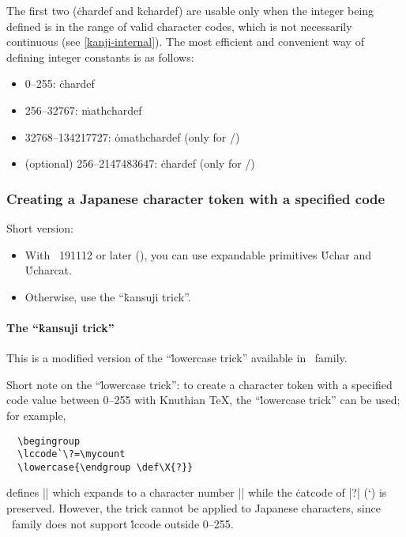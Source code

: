 \documentclass[a4paper,11pt,dvipdfmx]{article}
\begin{document}
The first two (\.{chardef} and \.{kchardef}) are usable only when
the integer being defined is in the range of valid character codes,
which is not necessarily continuous (see \ref{kanji-internal}).
The most efficient and convenient way of defining integer constants
is as follows:
\begin{itemize}
 \item 0--255: \.{chardef}
 \item 256--32767: \.{mathchardef}
 \item 32768--134217727: \.{omathchardef} (only for \epTeX/\eupTeX)
 \item (optional) 256--2147483647: \.{chardef} (only for \upTeX/\eupTeX)
\end{itemize}

\subsubsection{Creating a Japanese character token with a specified code}

Short version:
\begin{itemize}
 \item With \epTeX~191112 or later (),
   you can use expandable primitives \.{Uchar} and \.{Ucharcat}.
 \item Otherwise, use the ``\.{kansuji} trick''.
\end{itemize}

\paragraph{The ``\.{kansuji} trick''}
This is a modified version of the ``\.{lowercase} trick''
available in \pTeX\ family.

\begin{dangerous}
Short note on the ``\.{lowercase} trick'':
to create a character token with a specified code value between 0--255
with Knuthian \TeX, the ``\.{lowercase} trick'' can be used; for example,
\begin{verbatim}
  \begingroup
  \lccode`\?=\mycount
  \lowercase{\endgroup \def\X{?}}
\end{verbatim}
defines |\X| which expands to a character number |\mycount|
while the \.{catcode} of |?| (\the\catcode`\?) is preserved.
However, the trick cannot be applied to Japanese characters,
since \pTeX\ family does not support \.{lccode} outside 0--255.
\end{dangerous}
\end{document}
